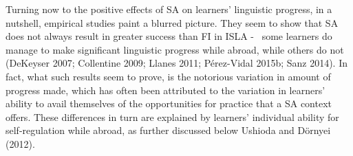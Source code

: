 \begin{styleStandard}
Turning now to the positive effects of SA on learners’ linguistic progress, in a nutshell, empirical studies paint a blurred picture. They seem to show that SA does not always result in greater success than FI in ISLA - \ some learners do manage to make significant linguistic progress while abroad, while others do not (DeKeyser 2007; Collentine 2009; Llanes 2011; Pérez-Vidal 2015b; Sanz 2014). In fact, what such results seem to prove, is the notorious variation in amount of progress made, which has often been attributed to the variation in learners’ ability to avail themselves of the opportunities for practice that a SA context offers. These differences in turn are explained by learners’ individual ability for self-regulation while abroad, as further discussed below Ushioda and Dörnyei (2012). 
\end{styleStandard}

